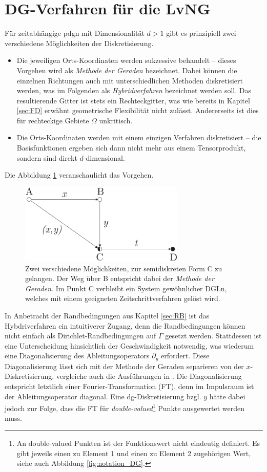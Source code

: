 \section{DG-Verfahren für die LvNG}\label{sec:primal}
Für zeitabhängige \ac{pdg}n mit Dimensionalität $d>1$ gibt es prinzipiell zwei verschiedene Möglichkeiten der Diskretisierung.
\begin{itemize}
  \item Die jeweiligen Orts-Koordinaten werden sukzessive behandelt -- dieses Vorgehen wird als \emph{Methode der Geraden} bezeichnet. Dabei können die einzelnen Richtungen auch mit unterschiedlichen Methoden diskretisiert werden, was im Folgenden als \emph{Hybridverfahren} bezeichnet werden soll. Das resultierende Gitter ist stets ein Rechteckgitter, was wie bereits in Kapitel \ref{sec:FD} erwähnt geometrische Flexibilität nicht zulässt. Andererseits ist dies für rechteckige Gebiete $\Omega$ unkritisch.
  \item Die Orts-Koordinaten werden mit einem einzigen Verfahren diskretisiert -- die Basisfunktionen ergeben sich dann nicht mehr aus einem Tensorprodukt, sondern sind direkt $d$-dimensional.
\end{itemize}
Die Abbildung \ref{fig:methodeDerGeraden} veranschaulicht das Vorgehen.
\begin{figure}
  \centering
  \includegraphics[width=0.7\textwidth]{files/methodeDerGeraden.pdf}
  \caption{Zwei verschiedene Möglichkeiten, zur semidiskreten Form C zu gelangen. Der Weg über B entspricht dabei der \emph{Methode der Geraden}. Im Punkt C verbleibt ein System gewöhnlicher DGLn, welches mit einem geeigneten Zeitschrittverfahren gelöst wird.}
  \label{fig:methodeDerGeraden}
\end{figure}
In Anbetracht der Randbedingungen aus Kapitel \ref{sec:RB} ist das Hybdriverfahren ein intuitiverer Zugang, denn die Randbedingungen können nicht einfach als Dirichlet-Randbedingungen auf $\Gamma$ gesetzt werden. Stattdessen ist eine Unterscheidung hinsichtlich der Geschwindigkeit notwendig, was wiederum eine Diagonalisierung des Ableitungsoperators $\partial_y$ erfordert. Diese Diagonalisierung lässt sich mit der Methode der Geraden separieren von der $x$-Diskretisierung, vergleiche auch die Ausführungen in \cite{lukas1}. Die Diagonalisierung entspricht letztlich einer Fourier-Transformation (FT), denn im Impulsraum ist der Ableitungsoperator  diagonal. Eine \ac{dg}-Diskretisierung bzgl. $y$ hätte dabei jedoch zur Folge, dass die FT für \emph{double-valued}\footnote{An double-valued Punkten ist der Funktionswert nicht eindeutig definiert. Es gibt jeweils einen zu Element 1 und einen zu Element 2 zugehörigen Wert, siehe auch Abbildung \ref{fig:notation_DG}.} Punkte ausgewertet werden muss.

